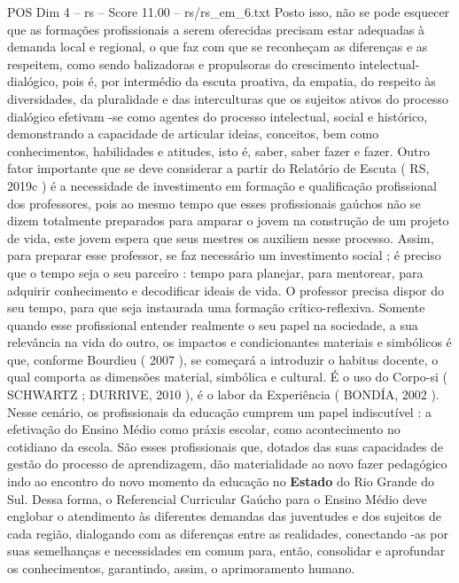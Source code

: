 \begin{textsample}{POS Dim 4 – rs – Score 11.00 – rs/rs\_em\_6.txt}
Posto isso, não se pode esquecer que as formações profissionais a serem oferecidas precisam estar adequadas à demanda local e regional, o que faz com que se reconheçam as diferenças e as respeitem, como sendo balizadoras e propulsoras do crescimento intelectual-dialógico, pois é, por intermédio da escuta proativa, da empatia, do respeito às diversidades, da pluralidade e das interculturas que os sujeitos ativos do processo dialógico efetivam -se como agentes do processo intelectual, social e histórico, demonstrando a capacidade de articular ideias, conceitos, bem como conhecimentos, habilidades e atitudes, isto é, saber, saber fazer e fazer.
Outro fator importante que se deve considerar a partir do Relatório de Escuta ( RS, 2019c ) é a necessidade de investimento em formação e qualificação profissional dos professores, pois ao mesmo tempo que esses profissionais gaúchos não se dizem totalmente preparados para amparar o jovem na construção de um projeto de vida, este jovem espera que seus mestres os auxiliem nesse processo.
Assim, para preparar esse professor, se faz necessário um investimento social ; é preciso que o tempo seja o seu parceiro : tempo para planejar, para mentorear, para adquirir conhecimento e decodificar ideais de vida.
O professor precisa dispor do seu tempo, para que seja instaurada uma formação crítico-reflexiva.
Somente quando esse profissional entender realmente o seu papel na sociedade, a sua relevância na vida do outro, os impactos e condicionantes materiais e simbólicos é que, conforme Bourdieu ( 2007 ), se começará a introduzir o habitus docente, o qual comporta as dimensões material, simbólica e cultural.
É o uso do Corpo-si ( SCHWARTZ ; DURRIVE, 2010 ), é o labor da Experiência ( BONDÍA, 2002 ).
Nesse cenário, os profissionais da educação cumprem um papel indiscutível : a efetivação do Ensino Médio como práxis escolar, como acontecimento no cotidiano da escola.
São esses profissionais que, dotados das suas capacidades de gestão do processo de aprendizagem, dão materialidade ao novo fazer pedagógico indo ao encontro do novo momento da educação no \textbf{Estado} do Rio Grande do Sul.
Dessa forma, o Referencial Curricular Gaúcho para o Ensino Médio deve englobar o atendimento às diferentes demandas das juventudes e dos sujeitos de cada região, dialogando com as diferenças entre as realidades, conectando -as por suas semelhanças e necessidades em comum para, então, consolidar e aprofundar os conhecimentos, garantindo, assim, o aprimoramento humano.

\end{textsample}
